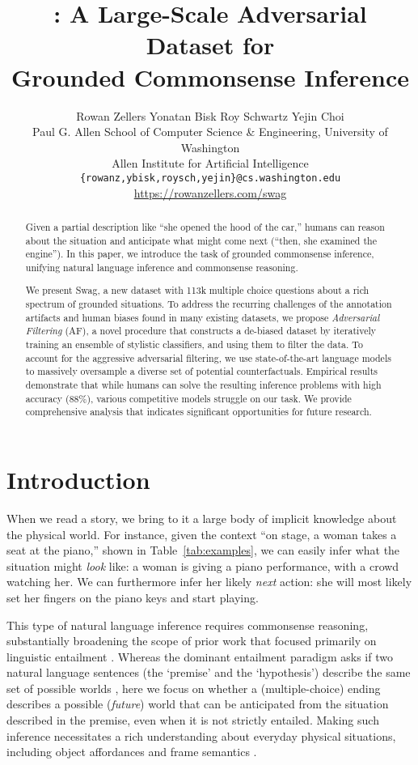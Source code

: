 \documentclass[11pt,a4paper]{article}
\title{
\titledatasetname: A Large-Scale Adversarial Dataset for\\ Grounded Commonsense Inference
}
\author{Rowan Zellers \: \: 
  Yonatan Bisk \: \:
  Roy Schwartz \: \:
  Yejin Choi\\
  Paul G. Allen School of Computer Science \& Engineering, University of Washington \\
  Allen Institute for Artificial Intelligence\\
  {\tt \{rowanz,ybisk,roysch,yejin\}@cs.washington.edu}\\ 
  \vspace{1mm} \url{https://rowanzellers.com/swag}
}
\date{}
\newcommand\customfont[1]{{\usefont{T1}{perm}{m}{n}#1}}
\newcommand{\datasetname}{{\small\customfont{Swag}}}
\begin{document}
\maketitle
\thispagestyle{plain}
\begin{abstract}
Given a partial description like ``she opened the hood of the car,'' humans can reason about the situation and anticipate what might come next (``then, she examined the engine''). 
In this paper, we introduce the task of grounded commonsense inference, 
unifying natural language inference and commonsense reasoning.

We present \datasetname, a new dataset with 113k multiple choice questions about a rich spectrum of grounded situations. To address the recurring challenges of the annotation artifacts and human biases found in many existing datasets, we propose \emph{Adversarial Filtering} (AF), a novel procedure that constructs a de-biased dataset by iteratively training an ensemble of stylistic classifiers, and using them to filter the data. To account for the aggressive adversarial filtering, we use state-of-the-art language models to massively oversample a diverse set of potential counterfactuals. Empirical results demonstrate that while humans can solve the resulting inference problems with high accuracy (88\%), various competitive models struggle on our task. We provide comprehensive analysis that indicates significant opportunities for future research. 
 \end{abstract}
\section{Introduction}
\label{sec:intro}



When we read a story, we bring to it a large body of implicit knowledge about the physical world. For instance, given the context ``on stage, a woman takes a seat at the piano,'' shown in Table~\ref{tab:examples}, we can easily infer 
what the situation might \emph{look} like: a woman is giving a piano performance, with a crowd watching her. We can furthermore infer her likely \emph{next} action: 
she will most likely set her fingers on the piano keys and start playing.


This type of {natural language inference} requires 
commonsense reasoning, substantially broadening the scope of prior work that focused primarily on linguistic entailment \cite{the_entailment_definition_rte_people_used}. 
Whereas the dominant 
entailment paradigm asks if two natural language sentences (the `premise' and the `hypothesis') describe the same set of possible worlds \cite{dagan2006pascal, bowman2015snli},
here we focus on whether a (multiple-choice) ending describes a possible (\emph{future}) world that can be anticipated from the situation described in the premise, even when it is not strictly entailed. 
Making such inference necessitates a rich understanding about everyday physical situations, 
including object affordances \cite{gibson1979ecological} and frame semantics \cite{baker1998berkeley}. 
\end{document}
